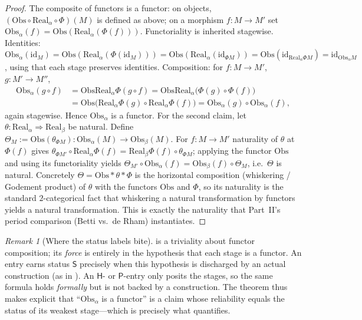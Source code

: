 \documentclass[12pt]{article}
\theoremstyle{definition}
\theoremstyle{remark}
\newtheorem{remark}[theorem]{Remark}
\newcommand{\Real}{\mathrm{Real}}
\newcommand{\Obs}{\mathrm{Obs}}
\newcommand{\id}{\mathrm{id}}
\newcommand{\Sstat}{\mathsf{S}}
\newcommand{\Hstat}{\mathsf{H}}
\newcommand{\Pstat}{\mathsf{P}}
\begin{document}
\begin{proof}
The composite of functors is a functor: on objects,
$(\Obs \circ \Real_\alpha \circ \Phi)(M)$ is defined as above; on a morphism
$f : M \to M'$ set
$\Obs_\alpha(f) = \Obs(\Real_\alpha(\Phi(f)))$. Functoriality is inherited
stagewise. Identities:
$\Obs_\alpha(\id_M) = \Obs(\Real_\alpha(\Phi(\id_M))) =
\Obs(\Real_\alpha(\id_{\Phi M})) = \Obs(\id_{\Real_\alpha\Phi M}) =
\id_{\Obs_\alpha M}$, using that each stage preserves identities. Composition:
for $f : M \to M'$, $g : M' \to M''$,
\[
\begin{aligned}
  \Obs_\alpha(g \circ f)
  &= \Obs\Real_\alpha\Phi(g \circ f)
   = \Obs\Real_\alpha\bigl(\Phi(g)\circ\Phi(f)\bigr)\\
  &= \Obs\bigl(\Real_\alpha\Phi(g) \circ \Real_\alpha\Phi(f)\bigr)
   = \Obs_\alpha(g)\circ\Obs_\alpha(f),
\end{aligned}
\]
again stagewise. Hence $\Obs_\alpha$ is a functor. For the second claim, let
$\theta : \Real_\alpha \Rightarrow \Real_\beta$ be natural. Define
$\Theta_M := \Obs(\theta_{\Phi M}) : \Obs_\alpha(M) \to \Obs_\beta(M)$. For
$f : M \to M'$ naturality of $\theta$ at $\Phi(f)$ gives
$\theta_{\Phi M'} \circ \Real_\alpha\Phi(f) = \Real_\beta\Phi(f) \circ
\theta_{\Phi M}$; applying the functor $\Obs$ and using its functoriality yields
$\Theta_{M'} \circ \Obs_\alpha(f) = \Obs_\beta(f) \circ \Theta_M$, i.e.\ $\Theta$
is natural. Concretely $\Theta = \Obs \ast \theta \ast \Phi$ is the horizontal
composition (whiskering / Godement product) of $\theta$ with the functors $\Obs$
and $\Phi$, so its naturality is the standard $2$-categorical fact that
whiskering a natural transformation by functors yields a natural transformation.
This is exactly the naturality that Part~II's period comparison
(Betti vs.\ de Rham) instantiates.
\end{proof}

\begin{remark}[Where the status labels bite]
\label{rem:status-bite}
 is a triviality about functor composition; its \emph{force}
is entirely in the hypothesis that each stage is a functor. An entry earns status
$\Sstat$ precisely when this hypothesis is discharged by an actual construction
(as in ). An $\Hstat$- or $\Pstat$-entry only posits the stages,
so the same formula holds \emph{formally} but is not backed by a construction.
The theorem thus makes explicit that ``$\Obs_\alpha$ is a functor'' is a claim
whose reliability equals the status of its weakest stage---which is precisely
what  quantifies.
\end{remark}
\end{document}
